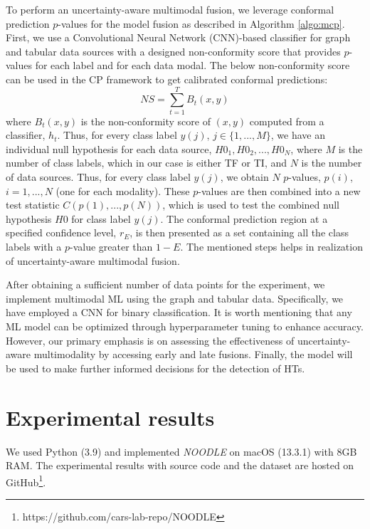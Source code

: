 To perform an uncertainty-aware multimodal fusion, we leverage conformal prediction $p$-values for the model fusion as described in Algorithm \ref{algo:mcp}. First, we use a Convolutional Neural Network (CNN)-based classifier for graph and tabular data sources with a designed non-conformity score that provides $p$-values for each label and for each data modal. The below non-conformity score can be used in the CP framework to get calibrated conformal predictions:
\begin{equation}
NS = \sum_{t=1}^T B_t(x, y)
\end{equation}
where \(B_t(x, y)\) is the non-conformity score of \((x, y)\) computed from a classifier, \(h_t\). Thus, for every class label \(y(j)\), \(j \in \{1, ..., M\}\), we have an individual null hypothesis for each data source, \(H0_1, H0_2, ..., H0_N\), where \(M\) is the number of class labels, which in our case is either TF or TI, and \(N\) is the number of data sources. Thus, for every class label \(y(j)\), we obtain \(N\) $p$-values, \(p(i)\), \(i = 1,..., N\) (one for each modality). These $p$-values are then combined into a new test statistic \(C(p(1), ..., p(N))\), which is used to test the combined null hypothesis \(H0\) for class label \(y(j)\). %
The conformal prediction region at a specified confidence level, \(r_E\), is then presented as a set containing all the class labels with a $p$-value greater than \(1-E\). The mentioned steps helps in realization of uncertainty-aware multimodal fusion.

After obtaining a sufficient number of data points for the experiment, we implement multimodal ML using the graph and tabular data. Specifically, we have employed a CNN for binary classification. It is worth mentioning that any ML model can be optimized through hyperparameter tuning to enhance accuracy. However, our primary emphasis is on assessing the effectiveness of uncertainty-aware multimodality by accessing early and late fusions. Finally, the model will be used to make further informed decisions for the detection of HTs.

\section*{Experimental results}
\label{sec:Results}
We used Python (3.9) and implemented \textit{NOODLE} on macOS (13.3.1) with 8GB RAM. The experimental results with source code and the dataset are hosted on GitHub\footnote{https://github.com/cars-lab-repo/NOODLE}.

